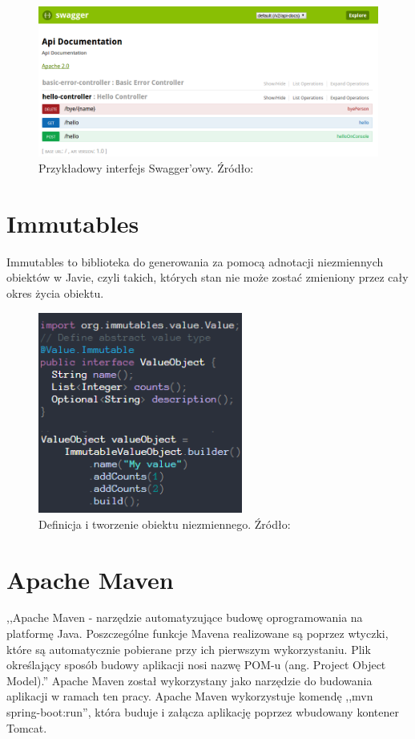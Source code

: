 \begin{figure}[h!]
  \centering
    \includegraphics[width=1.0\textwidth]{images/swagger.png}
  \caption{Przykładowy interfejs Swagger'owy. Źródło: \cite{Swagger}}
\end{figure}

\section{Immutables}

Immutables to biblioteka do generowania za pomocą adnotacji niezmiennych obiektów w Javie, czyli takich, których stan nie może zostać zmieniony przez cały okres życia obiektu. 

\begin{figure}[h!]
  \centering
    \includegraphics[width=0.6\textwidth]{images/immutables.png}
  \caption{Definicja i tworzenie obiektu niezmiennego. Źródło: \cite{Immutables}}
\end{figure}


\section{Apache Maven}
,,Apache Maven - narzędzie automatyzujące budowę oprogramowania na platformę Java. Poszczególne funkcje Mavena realizowane są poprzez wtyczki, które są automatycznie pobierane przy ich pierwszym wykorzystaniu. Plik określający sposób budowy aplikacji nosi nazwę POM-u (ang. Project Object Model).''\cite{maven} Apache Maven został wykorzystany jako narzędzie do budowania aplikacji w ramach ten pracy. Apache Maven wykorzystuje komendę ,,mvn spring-boot:run'', która buduje i załącza aplikację poprzez wbudowany kontener Tomcat.


